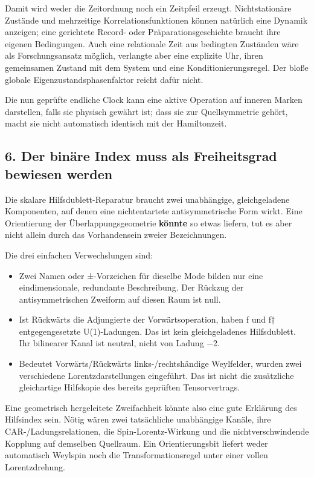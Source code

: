 Damit wird weder die Zeitordnung noch ein Zeitpfeil erzeugt.
Nichtstationäre Zustände und mehrzeitige Korrelationsfunktionen können
natürlich eine Dynamik anzeigen; eine gerichtete Record- oder
Präparationsgeschichte braucht ihre eigenen Bedingungen. Auch eine
relationale Zeit aus bedingten Zuständen wäre als Forschungsansatz
möglich, verlangte aber eine explizite Uhr, ihren gemeinsamen Zustand
mit dem System und eine Konditionierungsregel. Der bloße globale
Eigenzustandsphasenfaktor reicht dafür nicht.

Die nun geprüfte endliche Clock kann eine aktive Operation auf inneren
Marken darstellen, falls sie physisch gewährt ist; dass sie zur
Quellsymmetrie gehört, macht sie nicht automatisch identisch mit der
Hamiltonzeit.

\subsection{6. Der binäre Index muss als Freiheitsgrad bewiesen
werden}\label{der-binuxe4re-index-muss-als-freiheitsgrad-bewiesen-werden}

Die skalare Hilfsdublett-Reparatur braucht zwei unabhängige,
gleichgeladene Komponenten, auf denen eine nichtentartete
antisymmetrische Form wirkt. Eine Orientierung der Überlappungsgeometrie
\textbf{könnte} so etwas liefern, tut es aber nicht allein durch das
Vorhandensein zweier Bezeichnungen.

Die drei einfachen Verwechslungen sind:

\begin{itemize}
\tightlist
\item
  Zwei Namen oder ±-Vorzeichen für dieselbe Mode bilden nur eine
  eindimensionale, redundante Beschreibung. Der Rückzug der
  antisymmetrischen Zweiform auf diesen Raum ist null.
\item
  Ist Rückwärts die Adjungierte der Vorwärtsoperation, haben f und f†
  entgegengesetzte U(1)-Ladungen. Das ist kein gleichgeladenes
  Hilfsdublett. Ihr bilinearer Kanal ist neutral, nicht von Ladung −2.
\item
  Bedeutet Vorwärts/Rückwärts links-/rechtshändige Weylfelder, wurden
  zwei verschiedene Lorentzdarstellungen eingeführt. Das ist nicht die
  zusätzliche gleichartige Hilfskopie des bereits geprüften
  Tensorvertrags.
\end{itemize}

Eine geometrisch hergeleitete Zweifachheit könnte also eine gute
Erklärung des Hilfsindex sein. Nötig wären zwei tatsächliche unabhängige
Kanäle, ihre CAR-/Ladungsrelationen, die Spin-Lorentz-Wirkung und die
nichtverschwindende Kopplung auf demselben Quellraum. Ein
Orientierungsbit liefert weder automatisch Weylspin noch die
Transformationsregel unter einer vollen Lorentzdrehung.

